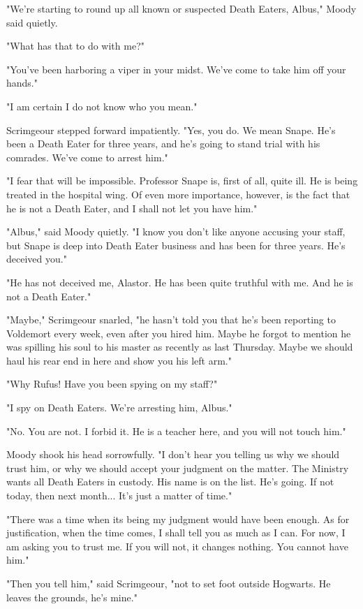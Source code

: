 "We're starting to round up all known or suspected Death Eaters, Albus," Moody said quietly.

"What has that to do with me?"

"You've been harboring a viper in your midst. We've come to take him off your hands."

"I am certain I do not know who you mean."

Scrimgeour stepped forward impatiently. "Yes, you do. We mean Snape. He's been a Death Eater for three years, and he's going to stand trial with his comrades. We've come to arrest him."

"I fear that will be impossible. Professor Snape is, first of all, quite ill. He is being treated in the hospital wing. Of even more importance, however, is the fact that he is not a Death Eater, and I shall not let you have him."

"Albus," said Moody quietly. "I know you don't like anyone accusing your staff, but Snape is deep into Death Eater business and has been for three years. He's deceived you."

"He has not deceived me, Alastor. He has been quite truthful with me. And he is not a Death Eater."

"Maybe," Scrimgeour snarled, "he hasn't told you that he's been reporting to Voldemort every week, even after you hired him. Maybe he forgot to mention he was spilling his soul to his master as recently as last Thursday. Maybe we should haul his rear end in here and show you his left arm."

"Why Rufus! Have you been spying on my staff?"

"I spy on Death Eaters. We're arresting him, Albus."

"No. You are not. I forbid it. He is a teacher here, and you will not touch him."

Moody shook his head sorrowfully. "I don't hear you telling us why we should trust him, or why we should accept your judgment on the matter. The Ministry wants all Death Eaters in custody. His name is on the list. He's going. If not today, then next month... It's just a matter of time."

"There was a time when its being my judgment would have been enough. As for justification, when the time comes, I shall tell you as much as I can. For now, I am asking you to trust me. If you will not, it changes nothing. You cannot have him."

"Then you tell him," said Scrimgeour, "not to set foot outside Hogwarts. He leaves the grounds, he's mine."

